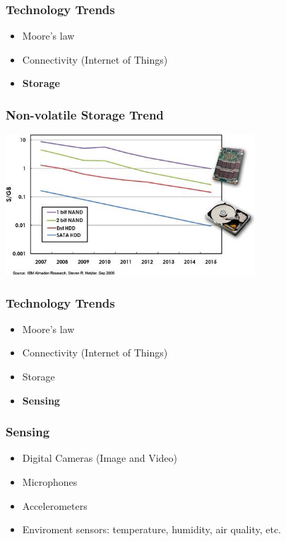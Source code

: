 \begin{frame}
  \frametitle{Technology Trends}
  \begin{itemize}
    \item Moore's law
    \item Connectivity (Internet of Things)
    \item {\bf Storage}
  \end{itemize}
\end{frame}

\begin{frame}
  \frametitle{Non-volatile Storage Trend}
  \begin{center}
    \includegraphics[width=0.7\textwidth]{slides/te5009-future-of-embedded-systems/nonvolatile-storage-trend.jpg}
  \end{center}
\end{frame}


\begin{frame}
  \frametitle{Technology Trends}
  \begin{itemize}
    \item Moore's law
    \item Connectivity (Internet of Things)
    \item Storage
    \item {\bf Sensing}
  \end{itemize}
\end{frame}

\begin{frame}
  \frametitle{Sensing}
  \begin{itemize}
    \item Digital Cameras (Image and Video)
    \item Microphones
    \item Accelerometers
    \item Enviroment sensors: temperature, humidity, air quality, etc.
  \end{itemize}
\end{frame}

